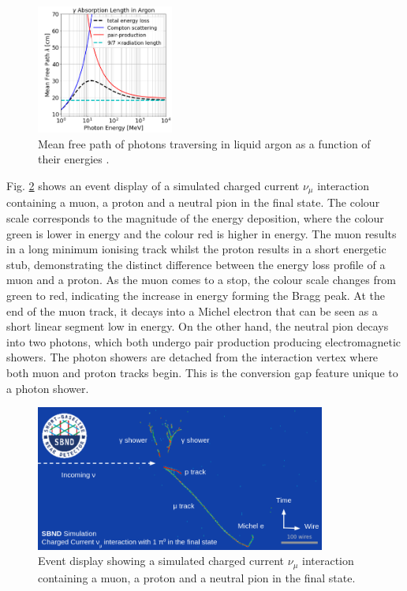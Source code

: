 \begin{figure}[ht!] 
\centering    
\includegraphics[width=0.4\textwidth]{uboone_gamma}
\caption[Mean Free Path of Photons in Liquid Argon]{
Mean free path of photons traversing in liquid argon as a function of their energies \cite{uboone_gamma}.
}
\label{fig:uboone_gamma}
\end{figure}

Fig. \ref{fig:track_shower} shows an event display of a simulated charged current $\nu_{\mu}$ interaction containing a muon, a proton and a neutral pion in the final state.
The colour scale corresponds to the magnitude of the energy deposition, where the colour green is lower in energy and the colour red is higher in energy.
The muon results in a long minimum ionising track whilst the proton results in a short energetic stub, demonstrating the distinct difference between the energy loss profile of a muon and a proton.
As the muon comes to a stop, the colour scale changes from green to red, indicating the increase in energy forming the Bragg peak.
At the end of the muon track, it decays into a Michel electron that can be seen as a short linear segment low in energy. 
On the other hand, the neutral pion decays into two photons, which both undergo pair production producing electromagnetic showers.
The photon showers are detached from the interaction vertex where both muon and proton tracks begin.
This is the conversion gap feature unique to a photon shower.

\begin{figure}[ht!] 
\centering    
\includegraphics[width=0.85\textwidth]{event_display}
\caption[Event Display of a Neutrino Interaction]{
Event display showing a simulated charged current $\nu_{\mu}$ interaction containing a muon, a proton and a neutral pion in the final state.
}
\label{fig:track_shower}
\end{figure}

